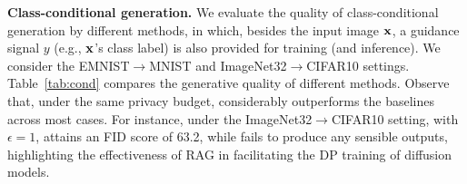 

{\bf Class-conditional generation.} We evaluate the quality of class-conditional generation by different methods, in which, besides the input image ${\mathbf{x}}$, a guidance signal $y$ (e.g., ${\mathbf{x}}$'s class label) is also provided for training (and inference). We consider the EMNIST$\rightarrow$MNIST and ImageNet32$\rightarrow$CIFAR10 settings. Table~\ref{tab:cond} compares the generative quality of different methods. 
Observe that, under the same privacy budget, \system considerably outperforms the baselines across most cases. For instance, under the ImageNet32$\rightarrow$CIFAR10 setting, with $\epsilon =1$, \system attains an FID score of 63.2, while \dpdm fails to produce any sensible outputs, highlighting the effectiveness of RAG in facilitating the DP training of diffusion models. 




